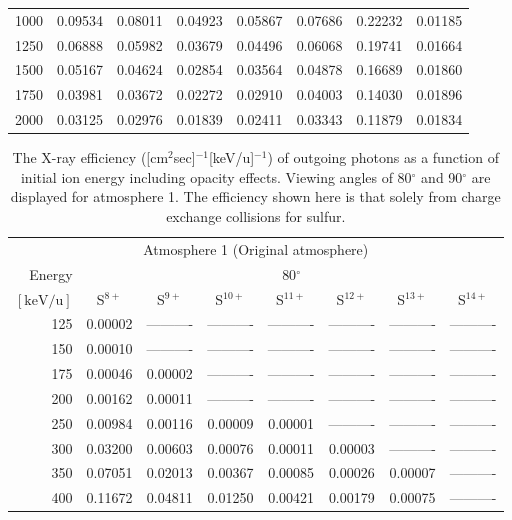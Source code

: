 \begin{table}[ht]
\begin{tabular}{r|c|c|c|c|c|c|c}
     1000 & 0.09534 & 0.08011 & 0.04923 & 0.05867 & 0.07686 & 0.22232 & 0.01185 \\
     1250 & 0.06888 & 0.05982 & 0.03679 & 0.04496 & 0.06068 & 0.19741 & 0.01664 \\
     1500 & 0.05167 & 0.04624 & 0.02854 & 0.03564 & 0.04878 & 0.16689 & 0.01860 \\
     1750 & 0.03981 & 0.03672 & 0.02272 & 0.02910 & 0.04003 & 0.14030 & 0.01896 \\
     2000 & 0.03125 & 0.02976 & 0.01839 & 0.02411 & 0.03343 & 0.11879 & 0.01834 \\ \cline{1-8}
    \end{tabular}
    \label{tab:XRayEffSCX1}
\end{table}

\begin{table}[ht]
    \centering
    \caption{The X-ray efficiency ([cm$^2$sec]$^{-1}$[keV/u]$^{-1}$) of outgoing photons as a function of initial ion energy including opacity effects. Viewing angles of 80$^\circ$ and 90$^\circ$ are displayed for atmosphere 1. The efficiency shown here is that solely from charge exchange collisions for sulfur.}
    \begin{tabular}{r|c|c|c|c|c|c|c}
    \multicolumn{8}{c}{Atmosphere 1 (Original atmosphere)} \\ \cline{2-8}
    Energy & \multicolumn{7}{c}{80$^\circ$} \\ \cline{2-8}
    $\mathrm{[keV/u]}$ & S$^{8+}$ & S$^{9+}$ & S$^{10+}$ & S$^{11+}$ & S$^{12+}$ & S$^{13+}$ & S$^{14+}$ \\ \cline{1-8}
      125 & 0.00002 & ---------- & ---------- & ---------- & ---------- & ---------- & ---------- \\
      150 & 0.00010 & ---------- & ---------- & ---------- & ---------- & ---------- & ---------- \\
      175 & 0.00046 & 0.00002 & ---------- & ---------- & ---------- & ---------- & ---------- \\
      200 & 0.00162 & 0.00011 & ---------- & ---------- & ---------- & ---------- & ---------- \\
      250 & 0.00984 & 0.00116 & 0.00009 & 0.00001 & ---------- & ---------- & ---------- \\
      300 & 0.03200 & 0.00603 & 0.00076 & 0.00011 & 0.00003 & ---------- & ---------- \\
      350 & 0.07051 & 0.02013 & 0.00367 & 0.00085 & 0.00026 & 0.00007 & ---------- \\
      400 & 0.11672 & 0.04811 & 0.01250 & 0.00421 & 0.00179 & 0.00075 & ---------- \\

\end{tabular}
\end{table}
